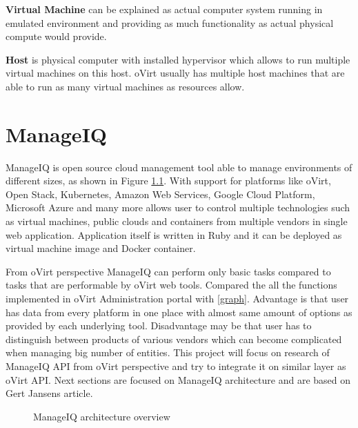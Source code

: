 \textbf{Virtual Machine} can be explained as actual computer system running in emulated environment and providing as much functionality as actual physical compute would provide.

\textbf{Host} is physical computer with installed hypervisor which allows to run multiple virtual machines on this host. oVirt usually has multiple host machines that are able to run as many virtual machines as resources allow.

\chapter{ManageIQ}\label{MIQ}
ManageIQ is open source cloud management tool able to manage environments of different sizes, as shown in Figure \ref{miq_architecture}. With support for platforms like oVirt, Open Stack, Kubernetes, Amazon Web Services, Google Cloud Platform, Microsoft Azure and many more allows user to control multiple technologies such as virtual machines, public clouds and containers from multiple vendors in single web application.
Application itself is written in Ruby and it can be deployed as virtual machine image and Docker container. 

From oVirt perspective ManageIQ can perform only basic tasks compared to tasks that are performable by oVirt web tools. Compared the all the functions implemented in oVirt Administration portal with \ref{graph}. Advantage is that user has data from every platform in one place with almost same amount of options as provided by each underlying tool. Disadvantage may be that user has to distinguish between products of various vendors which can become complicated when managing big number of entities. This project will focus on research of ManageIQ API from oVirt perspective and try to integrate it on similar layer as oVirt API.
Next sections are focused on ManageIQ architecture and are based on Gert Jansens article\cite{ManageIQarchitecture}.

\begin{figure}[h]
\caption{ManageIQ architecture overview\cite{manageIQimg}}
\label{miq_architecture}
\end{figure}


